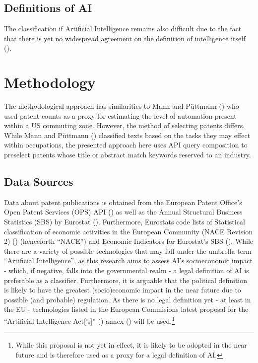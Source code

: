 \documentclass[
  11,
  a4paperpaper,
]{article}
\let\oldsection\section
\renewcommand\section{\clearpage\oldsection}
\begin{document}
\subsection{Definitions of AI}\label{definitions-of-ai}

The classification if Artificial Intelligence remains also difficult due
to the fact that there is yet no widespread agreement on the definition
of intelligence itself ().

\section{Methodology}\label{methodology}

The methodological approach has similarities to Mann and Püttmann
() who used patent counts as
a proxy for estimating the level of automation present within a US
commuting zone. However, the method of selecting patents differs. While
Mann and Püttmann () classified
texts based on the tasks they may effect within occupations, the
presented approach here uses API query composition to preselect patents
whose title or abstract match keywords reserved to an industry.

\subsection{Data Sources}\label{data-sources}

Data about patent publications is obtained from the European Patent
Office's Open Patent Services (OPS) API
() as well as the Annual Structural Business Statistics (SBS) by
Eurostat ().
Furthermore, Eurostats code lists of Statistical classification of
economic activities in the European Community (NACE Revision 2)
() (henceforth
``NACE'') and Economic Indicators for Eurostat's SBS
(). While there
are a variety of possible technologies that may fall under the umbrella
term ``Artificial Intelligence'', as this research aims to assess AI's
socioeconomic impact - which, if negative, falls into the governmental
realm - a legal definition of AI is preferable as a classifier.
Furthermore, it is arguable that the political definition is likely to
have the greatest (socio)economic impact in the near future due to
possible (and probable) regulation. As there is no legal definition yet
- at least in the EU - technologies listed in the European Commisions
latest proposal for the ``Artificial Intelligence Act{[}'s{]}''
() annex () will be used.\footnote{While this proposal is not
  yet in effect, it is likely to be adopted in the near future and is
  therefore used as a proxy for a legal definition of AI.}
\end{document}

